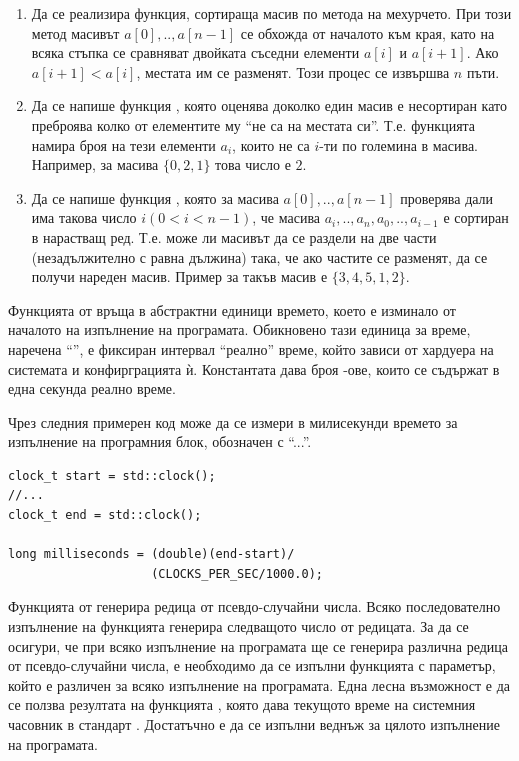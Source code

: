 {\begin{enumerate}[resume]
  \item Да се реализира функция, сортираща масив по метода на мехурчето. При този метод масивът $a[0],..,a[n-1]$ се обхожда от началото към края, като на всяка стъпка се сравняват двойката съседни елементи $a[i]$ и $a[i+1]$. Ако $a[i+1] < a[i]$, местата им се разменят. Този процес се извършва $n$ пъти.
  \item Да се напише функция , която оценява доколко един масив е несортиран като преброява колко от елементите му ``не са на местата си''. Т.е. функцията намира броя на тези елементи $a_i$, които не са $i$-ти по големина в масива. Например, за масива $\{0,2,1\}$ това число е $2$.
  \item Да се напише функция , която за масива $a[0],..,a[n-1]$ проверява дали има такова число $i(0 < i < n-1)$, че масива $a_i,..,a_n,a_0,..,a_{i-1}$ е сортиран в нарастващ ред. Т.е. може ли масивът да се раздели на две части (незадължително с равна дължина) така, че ако частите се разменят, да се получи нареден масив. Пример за такъв масив е $\{3,4,5,1,2\}$.

\end{enumerate}

\begin{mdframed}[hidealllines=true,backgroundcolor=gray!20]
Функцията  от  връща в абстрактни единици времето, което е изминало от началото на изпълнение на програмата. Обикновено тази единица за време, наречена ``'', е фиксиран интервал ``реално'' време, който зависи от хардуера на системата и конфирграцията ѝ. Константата  дава броя -ове, които се съдържат в една секунда реално време.

Чрез следния примерен код може да се измери в милисекунди времето за изпълнение на програмния блок, обозначен с ``...''.
\begin{verbatim}
clock_t start = std::clock();
//...
clock_t end = std::clock();

long milliseconds = (double)(end-start)/
                    (CLOCKS_PER_SEC/1000.0);

\end{verbatim}
\end{mdframed}
\begin{mdframed}[hidealllines=true,backgroundcolor=gray!20]
Функцията  от  генерира редица от псевдо-случайни числа. Всяко последователно изпълнение на функцията генерира следващото число от редицата. За да се осигури, че при всяко изпълнение на програмата ще се генерира различна редица от псевдо-случайни числа, е необходимо да се изпълни функцията  с параметър, който е различен за всяко изпълнение на програмата. Една лесна възможност е да се ползва резултата на функцията , която дава текущото време на системния часовник в стандарт . Достатъчно е  да се изпълни веднъж за цялото изпълнение на програмата.


\end{mdframed}}
